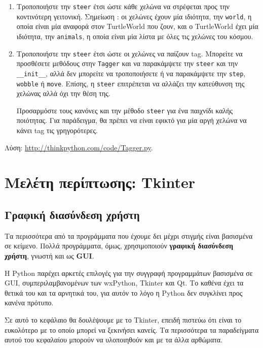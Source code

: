 \documentclass[10pt]{book}
\begin{document}
\begin{exercise}
\begin{enumerate}
\item Τροποποιήστε την  {\tt steer}  έτσι ώστε κάθε χελώνα να στρέφεται προς την 
  κοντινότερη γειτονική.  Σημείωση :  οι χελώνες έχουν μία ιδιότητα, την  
  {\tt world},  η οποία είναι μία αναφορά στον  TurtleWorld  που ζουν, και ο 
   TurtleWorld  έχει μία ιδιότητα, την  {\tt animals},  η οποία είναι μία λίστα 
  με όλες τις χελώνες του κόσμου.

\item Τροποποιήστε την  {\tt steer}  έτσι ώστε οι χελώνες να παίζουν  tag.   
  Μπορείτε να προσθέσετε μεθόδους στην  {\tt Tagger}  και να παρακάμψετε την  
  {\tt steer}  και την  \verb"__init__",  αλλά δεν μπορείτε να τροποποιήσετε ή 
  να παρακάμψετε την  {\tt step}, {\tt wobble}  ή  {\tt move}.   Επίσης, η  
  {\tt steer}  επιτρέπεται να αλλάζει την κατεύθυνση της χελώνας αλλά όχι την θέση της.

Προσαρμόστε τους κανόνες και την μέθοδο  {\tt steer}  για ένα παιχνίδι καλής 
ποιότητας.  Για παράδειγμα, θα πρέπει να είναι εφικτό για μία αργή χελώνα να κάνει tag 
τις γρηγορότερες.

\end{enumerate}

Λύση: \url{http://thinkpython.com/code/Tagger.py}.

\end{exercise}



\chapter{Μελέτη περίπτωσης: Tkinter}
\label{tkinter}

 
\section{Γραφική διασύνδεση χρήστη}

Τα περισσότερα από τα προγράμματα που έχουμε δει μέχρι στιγμής είναι βασισμένα σε κείμενο.
Πολλά προγράμματα, όμως, χρησιμοποιούν {\bf γραφική διασύνδεση χρήστη}, γνωστή και ως {\bf GUI}.

Η Python παρέχει αρκετές επιλογές για την συγγραφή προγραμμάτων βασισμένα σε
GUI, συμπεριλαμβανομένων των wxPython, Tkinter και Qt.  Το καθένα έχει τα θετικά του
και τα αρνητικά του, για αυτόν το λόγο η Python δεν συγκλίνει προς κανένα πρότυπο.

Σε αυτό το κεφάλαιο θα δουλέψουμε με το Tkinter, επειδή πιστεύω
ότι είναι το ευκολότερο με το οποίο μπορεί να ξεκινήσει κανείς.  Τα περισσότερα τα
παραδείγματα αυτού του κεφαλαίου μπορούν να υλοποιηθούν και με τα άλλα αρθώματα.
\end{document}

